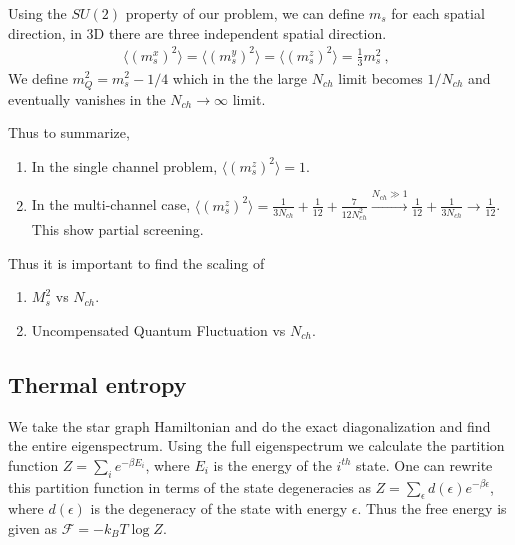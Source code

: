 \documentclass[reprint,prb,superscriptaddress]{revtex4-2}
\begin{document}
Using the $SU(2)$ property of our problem, we can define $m_s$ for each spatial direction, in 3D there are three independent spatial direction.
\begin{eqnarray}
\langle(m_s^x)^2\rangle=\langle(m_s^y)^2\rangle=\langle(m_s^z)^2\rangle=\frac{1}{3}m_s^2~,~~   
\end{eqnarray}
We define $m_Q^2=m_s^2-1/4$ which in the the large $N_{ch}$ limit becomes $1/N_{ch}$ and eventually vanishes in the $N_{ch}\rightarrow \infty$ limit. 


\noindent Thus to summarize,
\begin{enumerate}
\item In the single channel problem, $\langle (m_s^z)^2 \rangle=1$. 
\item In the multi-channel case,  
$\langle (m_s^z)^2 \rangle=\frac{1}{3N_{ch}}+\frac{1}{12}+\frac{7}{12N_{ch}^2} \xrightarrow[]{N_{ch}\gg 1} \frac{1}{12}+\frac{1}{3N_{ch}}\rightarrow \frac{1}{12}$. 
This show partial screening.
\end{enumerate}

Thus it is important to find the scaling of 

\begin{enumerate}
\item $M_s^2$ vs $N_{ch}$.
\item Uncompensated Quantum Fluctuation vs $N_{ch}$.
\end{enumerate}

\subsection{Thermal entropy}
We take the star graph Hamiltonian and do the exact diagonalization and find the entire eigenspectrum. Using the full eigenspectrum we calculate the partition function $Z=\sum_i e^{-\beta E_i}$, where $E_i$ is the energy of the $i^{th}$ state. One can rewrite this partition function in terms of the state degeneracies as $Z=\sum_{\epsilon} d(\epsilon) e^{-\beta \epsilon} $, where $d(\epsilon)$ is the degeneracy of the state with energy $\epsilon$. Thus the free energy is given as $\mathcal{F}=-k_BT\log Z$. 
\end{document}
